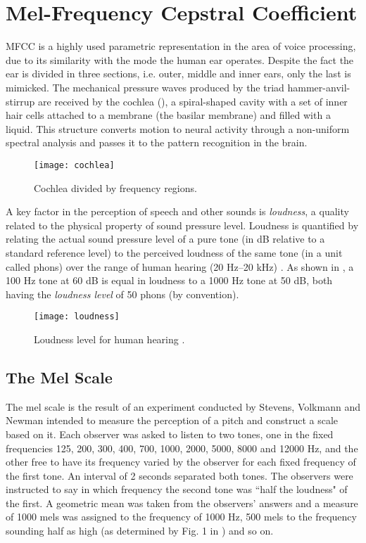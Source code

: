\newpage


\section{Mel-Frequency Cepstral Coefficient}

MFCC is a highly used parametric representation in the area of voice processing,
due to its similarity with the mode the human ear operates. Despite the fact the
ear is divided in three sections, i.e. outer, middle and inner ears, only the last
is mimicked. The mechanical pressure waves produced by the triad hammer-anvil-stirrup
are received by the cochlea (), a spiral-shaped cavity with a
set of inner hair cells attached to a membrane (the basilar membrane) and filled
with a liquid. This structure converts motion to neural activity through a non-uniform
spectral analysis \cite{rabiner.schafer.2007} and passes it to the pattern
recognition in the brain.

\begin{figure}[ht]
    \centering
    \texttt{[image: cochlea]}
    \caption{Cochlea divided by frequency regions.}
    \label{fig:cochlea}
\end{figure}

A key factor in the perception of speech and other sounds is \emph{loudness}, a
quality related to the physical property of sound pressure level. Loudness is
quantified by relating the actual sound pressure level of a pure tone (in dB
relative to a standard reference level) to the perceived loudness of the same
tone (in a unit called phons) over the range of human hearing (20 Hz–20 kHz)
\cite{rabiner.schafer.2007}. As shown in , a 100 Hz tone
at 60 dB is equal in loudness to a 1000 Hz tone at 50 dB, both having the
\emph{loudness level} of 50 phons (by convention).


\begin{figure}[ht]
    \centering
    \texttt{[image: loudness]}
    \caption{Loudness level for human hearing \cite{fletcher.munson.1933}.}
    \label{fig:loudness}
\end{figure}


\subsection{The Mel Scale}

The mel scale is the result of an experiment conducted by Stevens, Volkmann and
Newman \cite{stevens.volkmann.newman.1937} intended to measure the perception
of a pitch and construct a scale based on it. Each observer was asked to listen
to two tones, one in the fixed frequencies 125, 200, 300, 400, 700, 1000, 2000,
5000, 8000 and 12000 Hz, and the other free to have its frequency varied by the
observer for each fixed frequency of the first tone. An interval of 2 seconds
separated both tones. The observers were instructed to say in which frequency the
second tone was ``half the loudness" of the first. A geometric mean was taken from
the observers' answers and a measure of 1000 mels was assigned to the frequency
of 1000 Hz, 500 mels to the frequency sounding half as high (as determined by Fig. 1
in \cite{stevens.volkmann.newman.1937}) and so on.

